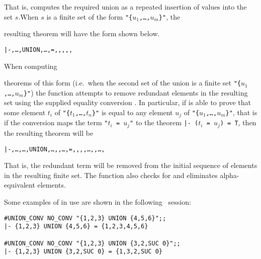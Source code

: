\noindent That is,  computes the required union as a repeated
insertion of values into the set {\small$s$}.\pagebreak[3] When {\small$s$} is
a finite set of the form {\small\verb!"{!\tt$u_1$,\dots,$u_m$\verb!}"!}, the
{\samepage resulting theorem will have the form shown below.

\begin{hol}\begin{alltt}
   |- \lb{},\dots,\rb UNION \lb{},\dots,\rb = \lb{},\m{\dots},,,\m{\dots},\rb
\end{alltt}\end{hol}

\noindent When computing} theorems of this form (i.e.\ when the second set of
the union is a finite set {\small\verb!"{!\tt$u_1$,\dots,$u_m$\verb!}"!}) the
function  attempts to remove redundant elements in the
resulting set using the supplied equality conversion .  In particular,
if  is able to prove that some element {\small$t_i$} of
{\small\verb!"{!\tt$t_1$,\dots,$t_n$\verb!}"!} is equal to any element
{\small$u_j$} of {\small\verb!"{!\tt$u_1$,\dots,$u_m$\verb!}"!}, that is if the
conversion  maps the term {\small\verb!"!$t_i$\verb! = !$u_j$\verb!"!}
to the theorem {\small\verb!|- (!$t_i$\verb! = !$u_j$\verb!) = T!}, then the
resulting theorem will be

\begin{hol}\begin{alltt}
   |- \lb{},\dots{},\dots,\rb UNION \lb{},\dots,,\dots,\rb = \lb{},\m{\dots},,,\dots,,\dots,\rb
\end{alltt}\end{hol}

\noindent That is, the redundant term  will be removed from the initial
sequence of elements in the resulting finite set.  The function
 also checks for and eliminates alpha-equivalent elements.

Some examples of  in use are shown in the following \HOL\
session:

\begin{session}\begin{verbatim}
#UNION_CONV NO_CONV "{1,2,3} UNION {4,5,6}";;
|- {1,2,3} UNION {4,5,6} = {1,2,3,4,5,6}

#UNION_CONV NO_CONV "{1,2,3} UNION {3,2,SUC 0}";;
|- {1,2,3} UNION {3,2,SUC 0} = {1,3,2,SUC 0}
\end{verbatim}\end{session}

